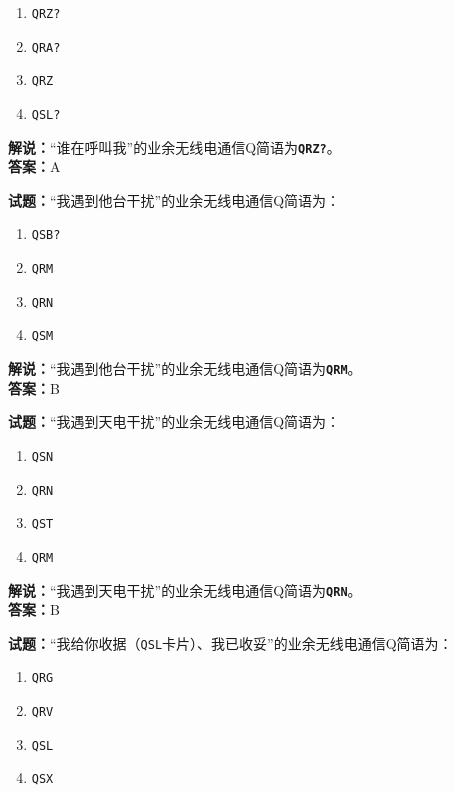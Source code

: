 \documentclass{ctexbook}
\begin{document}
\begin{enumerate}[leftmargin=3em]
  \item \texttt{QRZ?}
  \item \texttt{QRA?}
  \item \texttt{QRZ}
  \item \texttt{QSL?}
\end{enumerate}

\noindent\textbf{解说：}“谁在呼叫我”的业余无线电通信Q简语为\texttt{\textbf{QRZ?}}。\\\noindent\textbf{答案：}A

\vspace{\baselineskip}

\noindent\textbf{试题：}“我遇到他台干扰”的业余无线电通信Q简语为：

\begin{enumerate}[leftmargin=3em]
  \item \texttt{QSB?}
  \item \texttt{QRM}
  \item \texttt{QRN}
  \item \texttt{QSM}
\end{enumerate}
\noindent\textbf{解说：}“我遇到他台干扰”的业余无线电通信Q简语为\texttt{\textbf{QRM}}。\\\noindent\textbf{答案：}B

\vspace{\baselineskip}

\noindent\textbf{试题：}“我遇到天电干扰”的业余无线电通信Q简语为：

\begin{enumerate}[leftmargin=3em]
  \item \texttt{QSN}
  \item \texttt{QRN}
  \item \texttt{QST}
  \item \texttt{QRM}
\end{enumerate}

\noindent\textbf{解说：}“我遇到天电干扰”的业余无线电通信Q简语为\texttt{\textbf{QRN}}。\\\noindent\textbf{答案：}B

\vspace{\baselineskip}

\noindent\textbf{试题：}“我给你收据（\texttt{QSL}卡片）、我已收妥”的业余无线电通信Q简语为：

\begin{enumerate}[leftmargin=3em]
  \item \texttt{QRG}
  \item \texttt{QRV}
  \item \texttt{QSL}
  \item \texttt{QSX}
\end{enumerate}
\end{document}
